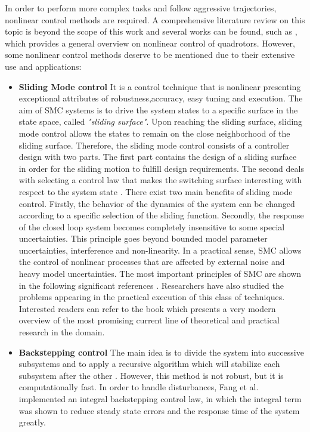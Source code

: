 \documentclass{thesisreport}
\begin{document}
In order to perform more complex tasks and follow aggressive trajectories, nonlinear control methods are required.
A comprehensive literature review on this topic is beyond the scope of this work and several works can be found, such as \cite{Zulu2016}, which provides a general overview on nonlinear control of quadrotors. However,
some nonlinear control methods deserve to be mentioned due to their extensive use and applications:

\begin{itemize}
\setlength{\itemindent}{-.5in}

	\item [] \textbf{Sliding Mode control} It is a control technique that is nonlinear presenting exceptional attributes of robustness,accuracy, easy tuning and execution. The aim of SMC systems is to drive the system states to a specific surface in the state space, called  \textit{"sliding surface"}. Upon reaching the sliding surface, sliding mode control allows the states to remain on the close neighborhood of the sliding surface. Therefore, the sliding mode control consists of a controller design with two parts. The first part contains the design of a sliding surface in order for the sliding motion to fulfill design requirements. The second deals with selecting a control law that makes the switching surface interesting with respect to the system state \cite{Utkin1997}.
There exist two main benefits of sliding mode control. Firstly, the behavior of the dynamics of the system can be changed according to a specific selection of the sliding function. Secondly, the response of the closed loop system becomes completely insensitive to some special uncertainties. This principle goes beyond bounded model parameter uncertainties, interference and non-linearity. In a practical sense, SMC allows the control of nonlinear processes that are affected by external noise and heavy model uncertainties.
The most important principles of SMC are shown in the following significant references \cite{Utkin1997,DeCarlo1998,Hung1993}. Researchers have also studied the problems appearing in the practical execution of this class of techniques. \cite{Young1999}
Interested readers can refer to the book \cite{Bartolini2008} which presents a very modern overview of the most promising current line of theoretical and practical research in the domain.

	\item [] \textbf{Backstepping control} The main idea is to divide the system into successive subsystems and to apply a recursive algorithm which will stabilize each subsystem after the other \cite{Madani2006}. However, this method is not robust, but it is computationally fast. In order to handle disturbances, Fang et al. \cite{Gao2011} implemented an integral backstepping control law, in which the integral term was shown to reduce steady state errors and the response time of the system greatly. 


\end{itemize}
\end{document}
